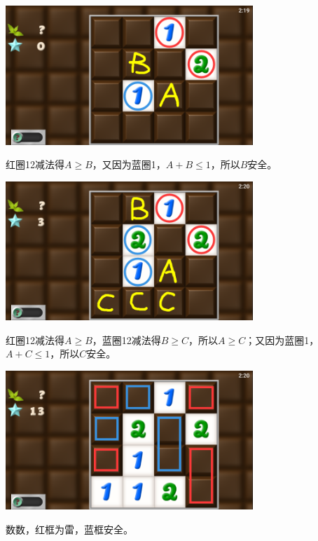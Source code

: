 \subsection{} %
\begin{center}
    \includegraphics[width=0.7\textwidth]{puzzle/144-1.png}
\end{center}
红圈12减法得$A\ge B$，又因为蓝圈1，$A+B\le 1$，所以$B$安全。
\begin{center}
    \includegraphics[width=0.7\textwidth]{puzzle/144-2.png}
\end{center}
红圈12减法得$A\ge B$，蓝圈12减法得$B\ge C$，所以$A\ge C$；又因为蓝圈1，$A+C\le 1$，所以$C$安全。
\begin{center}
    \includegraphics[width=0.7\textwidth]{puzzle/144-3.png}
\end{center}
数数，红框为雷，蓝框安全。

